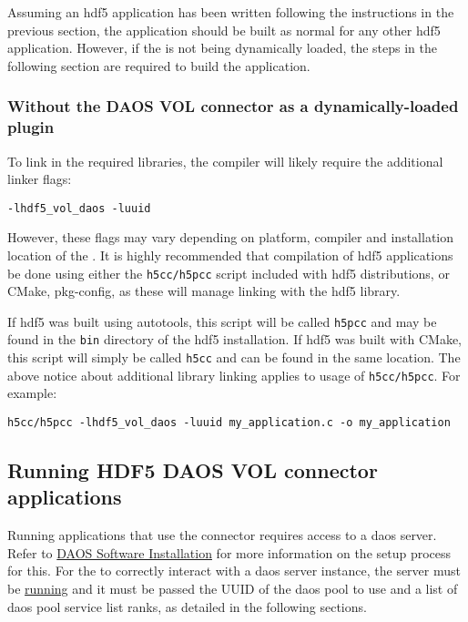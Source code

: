 \documentclass[../users_guide.tex]{subfiles}
\begin{document}
Assuming an \acrshort{hdf5} application has been written following the instructions in the previous section, the application should be built as normal for any other
\acrshort{hdf5} application. However,
if the \dvc{} is not being dynamically loaded, the steps in the following
section are required to build the application.

\subsubsection{Without the DAOS VOL connector as a dynamically-loaded plugin}

To link in the required libraries, the compiler will likely require the
additional linker flags:

\begin{verbatim}
-lhdf5_vol_daos -luuid
\end{verbatim}

However, these flags may vary depending on platform, compiler and installation
location of the \dvc{}. It is highly recommended that compilation
of \acrshort{hdf5} \dvc{} applications be done using either the
\texttt{h5cc/h5pcc} script included with \acrshort{hdf5} distributions, or CMake,
pkg-config, as these will manage linking with the \acrshort{hdf5} library.

If \acrshort{hdf5} was built using autotools, this script will be called \texttt{h5pcc} and
may be found in the \texttt{bin} directory of the \acrshort{hdf5} installation. If \acrshort{hdf5}
was built with CMake, this script will simply be called \texttt{h5cc} and can
be found in the same location. The above notice about additional library
linking applies to usage of \texttt{h5cc/h5pcc}. For example:
\begin{verbatim}
h5cc/h5pcc -lhdf5_vol_daos -luuid my_application.c -o my_application
\end{verbatim}

\subsection{Running HDF5 DAOS VOL connector applications}
\label{running_daos_vol_apps}

Running applications that use the \dvc{} connector requires access to a \acrshort{daos}
server. Refer to
\href{https://daos-stack.github.io/admin/installation/}{DAOS Software Installation}
for more information on the setup process for this. For the \dvc{}
to correctly interact with a \acrshort{daos} server instance, the server must be \hyperref[sec:daos_serv_start]{running} and it must be passed the UUID of the
\acrshort{daos} pool to use and a list of \acrshort{daos} pool service list ranks, as detailed in the
following sections.
\end{document}
